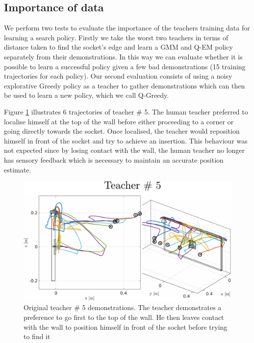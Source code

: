\subsection{Importance of data}

We perform two tests to evaluate the importance of the teachers training data for learning a search policy. Firstly we take the 
worst two teachers in terms of distance taken to find the socket's edge and learn a GMM and Q-EM policy separately from their 
demonstrations. In this way we can evaluate whether it is possible to learn a successful policy given 
a few bad demonstrations (15 training trajectories for each policy). Our second evaluation consists of using a noisy 
explorative Greedy policy as a teacher to gather demonstrations which can then be used to learn a new policy, which we call Q-Greedy. 

Figure \ref{fig:subj_5_traj} illustrates 6 trajectories of teacher \# 5. The human teacher preferred to
localise himself at the top of the wall before either proceeding to a corner or going directly towards the socket. Once localised, the teacher 
would reposition himself in front of the socket and try to achieve an insertion. This behaviour was not expected 
since by losing contact with the wall, the human teacher no longer has sensory feedback which is necessary 
to maintain an accurate position estimate.

\begin{figure}
 \centering
    \includegraphics[width=\textwidth]{./ch4-PiH/Figures/Fig/subject5.pdf}
    \caption{Original teacher \# 5 demonstrations. The teacher demonstrates a preference
    to go first to the top of the wall. He then leaves contact with the wall to position himself in front of the socket before trying to 
    find it}
    \label{fig:subj_5_traj}
 \end{figure}
 
